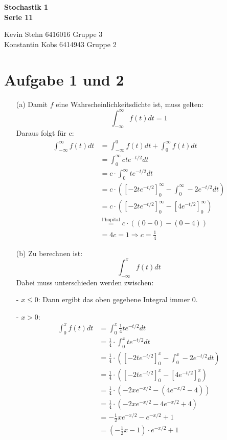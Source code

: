 \documentclass[10pt,a4paper]{article}
\begin{document}
\begin{center}
\textbf{Stochastik 1 \\ Serie 11 \\}
\end{center}

\begin{flushright}
Kevin Stehn 6416016 Gruppe 3 \\
Konstantin Kobs 6414943 Gruppe 2
\end{flushright}

\section*{Aufgabe 1 und 2}
\begin{itemize}
\item[(a)]
Damit $f$ eine Wahrscheinlichkeitsdichte ist, muss gelten:
$$\int_{-\infty}^{\infty}f(t) dt = 1$$
Daraus folgt für c:
\begin{align*}
\int_{-\infty}^{\infty}f(t) dt &= \int_{-\infty}^{0}f(t) dt + \int_{0}^{\infty}f(t) dt\\
&= \int_{0}^{\infty} cte^{-t/2} dt\\
&= c \cdot \int_{0}^{\infty} te^{-t/2} dt\\
&= c \cdot \left( [-2te^{-t/2}]_0^{\infty} - \int_0^\infty -2e^{-t/2} dt \right)\\
&= c \cdot \left( [-2te^{-t/2}]_0^{\infty} - [ 4e^{-t/2} ]_0^\infty \right)\\
&\overset{\text{l'hopital}}{=} c \cdot \left((0 - 0) - ( 0 - 4 ) \right)\\
&= 4c = 1 \Rightarrow c = \frac{1}{4}
\end{align*}

\item[(b)]
Zu berechnen ist:
$$\int_{-\infty}^{x}f(t) dt$$
Dabei muss unterschieden werden zwischen:
\item[-] $x \leq 0$: Dann ergibt das oben gegebene Integral immer $0$.
\item[-] $x > 0$:
\begin{align*}
\int_{0}^{x}f(t) dt &= \int_{0}^{x} \frac{1}{4}te^{-t/2} dt\\
&= \frac{1}{4} \cdot \int_{0}^{x} te^{-t/2} dt\\
&= \frac{1}{4} \cdot \left( [-2te^{-t/2}]_0^x - \int_{0}^{x} -2e^{-t/2} dt\right)\\
&= \frac{1}{4} \cdot \left( [-2te^{-t/2}]_0^x - [4e^{-t/2}]_0^x \right)\\
&= \frac{1}{4} \cdot \left( -2xe^{-x/2} - (4e^{-x/2} - 4) \right)\\
&= \frac{1}{4} \cdot \left( -2xe^{-x/2} - 4e^{-x/2} + 4 \right)\\
&= -\frac{1}{2}xe^{-x/2} - e^{-x/2} + 1\\
&= \left( -\frac{1}{2}x - 1\right) \cdot e^{-x/2} + 1\\
\end{align*}


\end{itemize}
\end{document}
